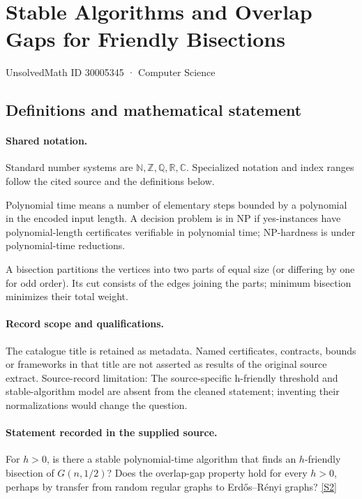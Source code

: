 \documentclass[11pt]{article}
\newcommand{\sref}[2]{\hyperlink{source:#1:#2}{[S#2]}}
\begin{document}
\setcounter{section}{30005344}
\section{Stable Algorithms and Overlap Gaps for Friendly Bisections}\label{30005345}
{\small\sffamily UnsolvedMath ID 30005345 · Computer Science}
\subsection{Definitions and mathematical statement}

\paragraph{Shared notation.}Standard number systems are $\mathbb N,\mathbb Z,\mathbb Q,\mathbb R,\mathbb C$. Specialized notation and index ranges follow the cited source and the definitions below.


Polynomial time means a number of elementary steps bounded by a polynomial in the encoded input length. A decision problem is in $\mathrm{NP}$ if yes-instances have polynomial-length certificates verifiable in polynomial time; NP-hardness is under polynomial-time reductions.

A bisection partitions the vertices into two parts of equal size (or differing by one for odd order). Its cut consists of the edges joining the parts; minimum bisection minimizes their total weight.
\paragraph{Record scope and qualifications.}
The catalogue title is retained as metadata. Named certificates, contracts, bounds or frameworks in that title are not asserted as results of the original source extract.
Source-record limitation: The source-specific h-friendly threshold and stable-algorithm model are absent from the cleaned statement; inventing their normalizations would change the question.
\paragraph{Statement recorded in the supplied source.}
For $h>0$, is there a stable polynomial-time algorithm that finds an $h$-friendly bisection of $G(n,1/2)$? Does the overlap-gap property hold for every $h>0$, perhaps by transfer from random regular graphs to Erdős–Rényi graphs? \sref{30005345}{2}
\end{document}

